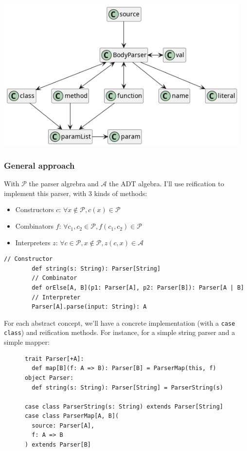 \begin{frame}[fragile]
\begin{overprint}
    \includegraphics[width=0.96\textwidth]{img/parser-structure.png}
  \end{overprint}
\end{frame}

\begin{frame}[fragile]
  \frametitle{General approach}

  \begin{overprint}
    With \(\mathcal{P}\) the parser algrebra and \(\mathcal{A}\) the ADT algebra. I'll use reification to implement this parser, with 3 kinds of methods:
    \begin{itemize}
      \item Constructors \(c\): \(\forall x \notin \mathcal{P}, c(x) \in \mathcal{P}\)
      \item Combinators \(f\): \(\forall c_1, c_2 \in \mathcal{P}, f(c_1, c_2) \in \mathcal{P}\)
      \item Interpreters \(z\): \(\forall c \in \mathcal{P}, x \notin \mathcal{P}, z(c, x) \in \mathcal{A}\)
    \end{itemize}
  
    \begin{example}
      \begin{lstlisting}[gobble=8]
        // Constructor
        def string(s: String): Parser[String]
        // Combinator
        def orElse[A, B](p1: Parser[A], p2: Parser[B]): Parser[A | B]
        // Interpreter
        Parser[A].parse(input: String): A
      \end{lstlisting}
    \end{example}
    
    For each abstract concept, we'll have a concrete implementation (with a \texttt{case class}) and reification methods. For instance, for a simple string parser and a simple mapper:
    
    \begin{lstlisting}
      trait Parser[+A]:
        def map[B](f: A => B): Parser[B] = ParserMap(this, f)
      object Parser:
        def string(s: String): Parser[String] = ParserString(s)
    
      case class ParserString(s: String) extends Parser[String]
      case class ParserMap[A, B](
        source: Parser[A],
        f: A => B
      ) extends Parser[B]
    \end{lstlisting}
  \end{overprint}
\end{frame}
